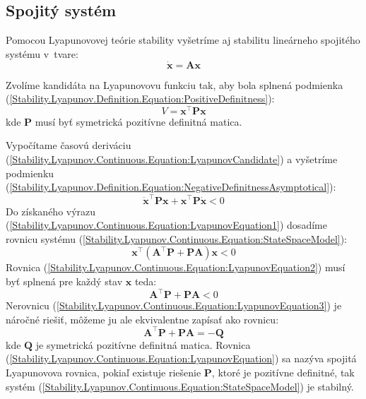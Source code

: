 \documentclass[a4paper, 10pt, ]{article}
\begin{document}
\subsection{Spojitý systém}
Pomocou Lyapunovovej teórie stability vyšetríme aj stabilitu lineárneho spojitého systému v~tvare:
\begin{equation}
    \label{Stability.Lyapunov.Continuous.Equation:StateSpaceModel}
    \dot{\bm{x}} = \bm{A} \bm{x}
\end{equation}

Zvolíme kandidáta na Lyapunovovu funkciu tak, aby bola splnená podmienka (\ref{Stability.Lyapunov.Definition.Equation:PositiveDefinitness}):
\begin{equation}
    \label{Stability.Lyapunov.Continuous.Equation:LyapunovCandidate}
    V = \bm{x}^\top \bm{P} \bm{x}
\end{equation}
kde $\bm{P}$ musí byť symetrická pozitívne definitná matica.

Vypočítame časovú deriváciu (\ref{Stability.Lyapunov.Continuous.Equation:LyapunovCandidate}) a vyšetríme podmienku (\ref{Stability.Lyapunov.Definition.Equation:NegativeDefinitnessAsymptotical}):
\begin{equation}
    \label{Stability.Lyapunov.Continuous.Equation:LyapunovEquation1}
    \dot{\bm{x}}^\top \bm{P} \bm{x} + \bm{x}^\top \bm{P} \dot{\bm{x}} < 0
\end{equation}
Do získaného výrazu (\ref{Stability.Lyapunov.Continuous.Equation:LyapunovEquation1}) dosadíme rovnicu systému (\ref{Stability.Lyapunov.Continuous.Equation:StateSpaceModel}):
\begin{equation}
    \label{Stability.Lyapunov.Continuous.Equation:LyapunovEquation2}
    \bm{x}^\top \left( \bm{A}^\top \bm{P} + \bm{P} \bm{A} \right) \bm{x} < 0
\end{equation}
Rovnica (\ref{Stability.Lyapunov.Continuous.Equation:LyapunovEquation2}) musí byť splnená pre každý stav $\bm{x}$ teda:
\begin{equation}
    \label{Stability.Lyapunov.Continuous.Equation:LyapunovEquation3}
    \bm{A}^\top \bm{P} + \bm{P} \bm{A} < 0
\end{equation}
Nerovnicu (\ref{Stability.Lyapunov.Continuous.Equation:LyapunovEquation3}) je náročné riešiť, môžeme ju ale ekvivalentne zapísať ako rovnicu: 
\begin{equation}
    \label{Stability.Lyapunov.Continuous.Equation:LyapunovEquation}
    \bm{A}^\top \bm{P} + \bm{P} \bm{A} = -\bm{Q}
\end{equation}
kde $\bm{Q}$ je symetrická pozitívne definitná matica. Rovnica (\ref{Stability.Lyapunov.Continuous.Equation:LyapunovEquation}) sa nazýva spojitá Lyapunovova rovnica, pokiaľ existuje riešenie $\bm{P}$, ktoré je pozitívne definitné, tak systém (\ref{Stability.Lyapunov.Continuous.Equation:StateSpaceModel}) je stabilný.
\end{document}
